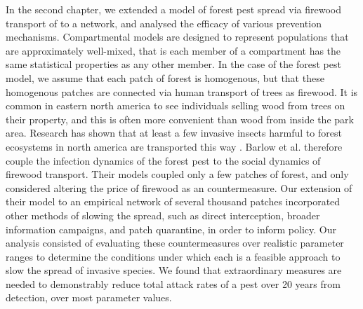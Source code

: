 In the second chapter, we extended a model of forest pest spread via firewood transport of \cite{barlow2014modelling} to a network, and analysed the efficacy of various prevention mechanisms. Compartmental models are designed to represent populations that are approximately well-mixed, that is each member of a compartment has the same statistical properties as any other member. In the case of the forest pest model, we assume that each patch of forest is homogenous, but that these homogenous patches are connected via human transport of trees as firewood. It is common in eastern north america to see individuals selling wood from trees on their property, and this is often more convenient than wood from inside the park area. Research has shown that at least a few invasive insects harmful to forest ecosystems in north america are transported this way \cite{koch2014using, tobin2010does, haack2010incidence}. Barlow et al. \cite{barlow2014modelling} therefore couple the infection dynamics of the forest pest to the social dynamics of firewood transport. Their models coupled only a few patches of forest, and only considered altering the price of firewood as an countermeasure. Our extension of their model to an empirical network of several thousand patches \cite{koch2014using} incorporated other methods of slowing the spread, such as direct interception, broader information campaigns, and patch quarantine, in order to inform policy. Our analysis consisted of evaluating these countermeasures over realistic parameter ranges to determine the conditions under which each is a feasible approach to slow the spread of invasive species. We found that extraordinary measures are needed to demonstrably reduce total attack rates of a pest over 20 years from detection, over most parameter values.

